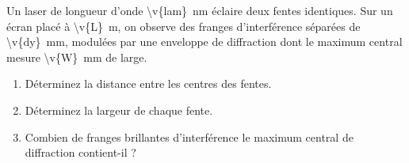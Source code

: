 Un laser de longueur d'onde \qty{\v{lam}}{nm} éclaire deux fentes identiques. Sur un écran placé à \qty{\v{L}}{m}, on observe des franges d'interférence séparées de \qty{\v{dy}}{mm}, modulées par une enveloppe de diffraction dont le maximum central mesure \qty{\v{W}}{mm} de large.

\begin{enumerate}[label=\alph*)]
    \item Déterminez la distance entre les centres des fentes.
    \item Déterminez la largeur de chaque fente.
    \item Combien de franges brillantes d'interférence le maximum central de diffraction contient-il ?
\end{enumerate}
